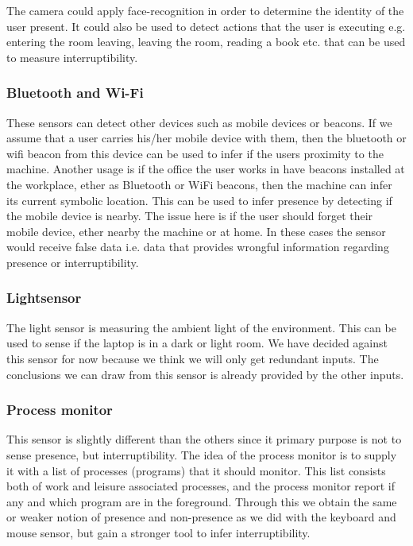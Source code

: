 \documentclass{sigchi}
\begin{document}
The camera could apply face-recognition in order to determine the identity of the user present.
It could also be used to detect actions that the user is executing e.g. entering the room leaving, leaving the room, reading a book etc. that can be used to measure interruptibility.

\subsubsection{Bluetooth and Wi-Fi}
These sensors can detect other devices such as mobile devices or beacons.
If we assume that a user carries his/her mobile device with them, then the bluetooth or wifi beacon from this device can be used to infer if the users proximity to the machine.
Another usage is if the office the user works in have beacons installed at the workplace, ether as Bluetooth or WiFi beacons, then the machine can infer its current symbolic location.
This can be used to infer presence by detecting if the mobile device is nearby.
The issue here is if the user should forget their mobile device, ether nearby the machine or at home.
In these cases the sensor would receive false data i.e. data that provides wrongful information regarding presence or interruptibility.

\subsubsection{Lightsensor}
The light sensor is measuring the ambient light of the environment.
This can be used to sense if the laptop is in a dark or light room.
We have decided against this sensor for now because we think we will only get redundant inputs.
The conclusions we can draw from this sensor is already provided by the other inputs.

\subsubsection{Process monitor}
This sensor is slightly different than the others since it primary purpose is not to sense presence, but interruptibility.
The idea of the process monitor is to supply it with a list of processes (programs) that it should monitor.
This list consists both of work and leisure associated processes, and the process monitor report if any and which program are in the foreground. %
Through this we obtain the same or weaker notion of presence and non-presence as we did with the keyboard and mouse sensor, but gain a stronger tool to infer interruptibility.
\end{document}
